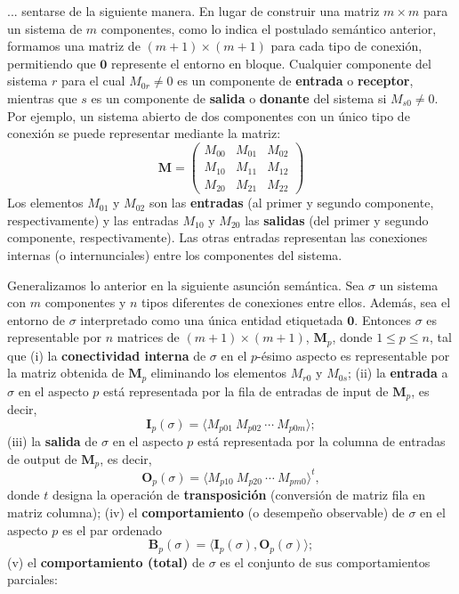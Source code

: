 {\fontsize{13}{15}\selectfont
... sentarse de la siguiente manera. En lugar de construir una matriz $m \times m$ para un sistema de $m$ componentes, como lo indica el postulado semántico anterior, formamos una matriz de $(m+1) \times (m+1)$ para cada tipo de conexión, permitiendo que $\mathbf{0}$ represente el entorno en bloque. Cualquier componente del sistema $r$ para el cual $M_{0r} \neq 0$ es un componente de \textbf{entrada} o \textbf{receptor}, mientras que $s$ es un componente de \textbf{salida} o \textbf{donante} del sistema si $M_{s0} \neq 0$. Por ejemplo, un sistema abierto de dos componentes con un único tipo de conexión se puede representar mediante la matriz:
$$ \mathbf{M} = \begin{pmatrix}
M_{00} & M_{01} & M_{02} \\
M_{10} & M_{11} & M_{12} \\
M_{20} & M_{21} & M_{22} 
\end{pmatrix} $$
Los elementos $M_{01}$ y $M_{02}$ son las \textbf{entradas} (al primer y segundo componente, respectivamente) y las entradas $M_{10}$ y $M_{20}$ las \textbf{salidas} (del primer y segundo componente, respectivamente). Las otras entradas representan las conexiones internas (o internunciales) entre los componentes del sistema.

Generalizamos lo anterior en la siguiente asunción semántica. Sea $\sigma$ un sistema con $m$ componentes y $n$ tipos diferentes de conexiones entre ellos. Además, sea el entorno de $\sigma$ interpretado como una única entidad etiquetada $\mathbf{0}$. Entonces $\sigma$ es representable por $n$ matrices de $(m+1) \times (m+1)$, $\mathbf{M}_p$, donde $1 \le p \le n$, tal que
(i) la \textbf{conectividad interna} de $\sigma$ en el $p$-ésimo aspecto es representable por la matriz obtenida de $\mathbf{M}_p$ eliminando los elementos $M_{r0}$ y $M_{0s}$;
(ii) la \textbf{entrada} a $\sigma$ en el aspecto $p$ está representada por la fila de entradas de input de $\mathbf{M}_p$, es decir,
$$ \mathbf{I}_p(\sigma) = \langle M_{p01} \ M_{p02} \ \cdots \ M_{p0m} \rangle; $$
(iii) la \textbf{salida} de $\sigma$ en el aspecto $p$ está representada por la columna de entradas de output de $\mathbf{M}_p$, es decir,
$$ \mathbf{O}_p(\sigma) = \langle M_{p10} \ M_{p20} \ \cdots \ M_{pm0} \rangle^t, $$
donde $t$ designa la operación de \textbf{transposición} (conversión de matriz fila en matriz columna);
(iv) el \textbf{comportamiento} (o desempeño observable) de $\sigma$ en el aspecto $p$ es el par ordenado
$$ \mathbf{B}_p(\sigma) = \langle \mathbf{I}_p(\sigma), \mathbf{O}_p(\sigma) \rangle; $$
(v) el \textbf{comportamiento (total)} de $\sigma$ es el conjunto de sus comportamientos parciales:
}

